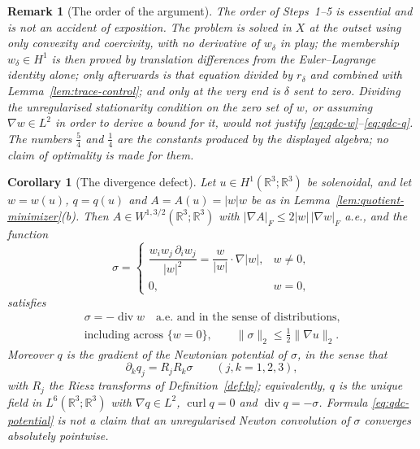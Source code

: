 \documentclass[11pt]{article}
\newtheorem{remark}[theorem]{Remark}
\newtheorem{corollary}[theorem]{Corollary}
\theoremstyle{definition}
\theoremstyle{plain}
\newcommand{\R}{\mathbb R}
\newcommand{\norm}[1]{\lVert #1\rVert}
\begin{document}
\begin{remark}[The order of the argument]\label{rem:qdc-order}
The order of Steps~1--5 is essential and is not an accident of exposition.
The problem is solved in $X$ at the outset using only convexity and coercivity, with
no derivative of $w_\delta$ in play; the membership $w_\delta\in H^1$ is then
proved by translation differences from the Euler--Lagrange identity alone;
only afterwards is that equation divided by $r_\delta$ and combined with
Lemma~\ref{lem:trace-control}; and only at the very end is $\delta$ sent to
zero.  Dividing the unregularised stationarity condition on the zero set of
$w$, or assuming $\nabla w\in L^2$ in order to derive a bound for it, would
not justify \eqref{eq:qdc-w}--\eqref{eq:qdc-q}.  The numbers $\frac54$ and
$\frac14$ are the constants produced by the displayed algebra; no claim of
optimality is made for them.
\end{remark}

\begin{corollary}[The divergence defect]\label{cor:quotient-defect}
Let $u\in H^1(\R^3;\R^3)$ be solenoidal, and let $w=w(u)$, $q=q(u)$ and
$A=A(u)=|w|w$ be as in Lemma~\ref{lem:quotient-minimizer}(b).  Then
$A\in W^{1,3/2}(\R^3;\R^3)$ with $|\nabla A|_F\le2|w|\,|\nabla w|_F$ a.e.,
and the function
\begin{equation}\label{eq:qdc-sigma}
 \sigma=\begin{cases}
 \dfrac{w_iw_j\,\partial_iw_j}{|w|^2}
 =\dfrac{w}{|w|}\cdot\nabla|w|, & w\ne0,\\[2mm]
 0,& w=0,
 \end{cases}
\end{equation}
satisfies
\begin{equation}\label{eq:qdc-sigmaid}
 \begin{gathered}
 \sigma=-\operatorname{div}w
 \quad\text{a.e.\ and in the sense of distributions,}\\
 \text{including across }\{w=0\},
 \qquad
 \norm\sigma_2\le\tfrac12\norm{\nabla u}_2 .
 \end{gathered}
\end{equation}
Moreover $q$ is the gradient of the Newtonian potential of $\sigma$, in the
sense that
\begin{equation}\label{eq:qdc-potential}
 \partial_kq_j=R_jR_k\sigma\qquad(j,k=1,2,3),
\end{equation}
with $R_j$ the Riesz transforms of Definition~\ref{def:lp}; equivalently,
$q$ is the unique field in $L^6(\R^3;\R^3)$ with $\nabla q\in L^2$,
$\operatorname{curl}q=0$ and $\operatorname{div}q=-\sigma$.  Formula
\eqref{eq:qdc-potential} is not a claim that an unregularised Newton
convolution of $\sigma$ converges absolutely pointwise.
\end{corollary}
\end{document}
